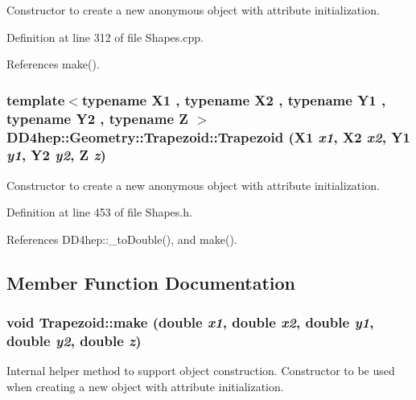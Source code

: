 Constructor to create a new anonymous object with attribute initialization. 

Definition at line 312 of file Shapes.cpp.

References make().\hypertarget{class_d_d4hep_1_1_geometry_1_1_trapezoid_a18a00d7d7e949210f07839329c04386c}{
\subsubsection[{Trapezoid}]{\setlength{\rightskip}{0pt plus 5cm}template$<$typename X1 , typename X2 , typename Y1 , typename Y2 , typename Z $>$ DD4hep::Geometry::Trapezoid::Trapezoid (X1 {\em x1}, \/  X2 {\em x2}, \/  Y1 {\em y1}, \/  Y2 {\em y2}, \/  Z {\em z})}}
\label{class_d_d4hep_1_1_geometry_1_1_trapezoid_a18a00d7d7e949210f07839329c04386c}


Constructor to create a new anonymous object with attribute initialization. 

Definition at line 453 of file Shapes.h.

References DD4hep::\_\-toDouble(), and make().

\subsection{Member Function Documentation}
\hypertarget{class_d_d4hep_1_1_geometry_1_1_trapezoid_ae6901e6e8639b330b5ecacff7c91792c}{
\subsubsection[{make}]{\setlength{\rightskip}{0pt plus 5cm}void Trapezoid::make (double {\em x1}, \/  double {\em x2}, \/  double {\em y1}, \/  double {\em y2}, \/  double {\em z})}}
\label{class_d_d4hep_1_1_geometry_1_1_trapezoid_ae6901e6e8639b330b5ecacff7c91792c}


Internal helper method to support object construction. Constructor to be used when creating a new object with attribute initialization. 


